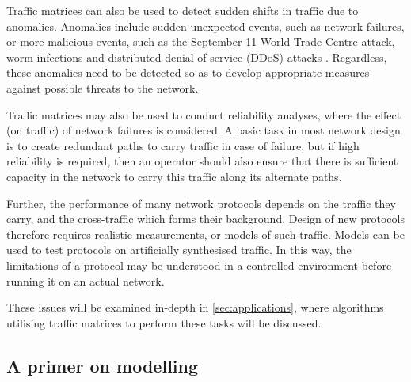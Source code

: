 Traffic matrices can also be used to detect sudden shifts in traffic
due to anomalies. Anomalies include sudden unexpected events, such as
network failures, or more malicious events, such as the September 11
World Trade Centre attack, worm infections and distributed denial of
service (DDoS) attacks \cite{Roughan02BRvariable}. Regardless, these
anomalies need to be detected so as to develop appropriate measures
against possible threats to the network. 

Traffic matrices may also be used to conduct reliability analyses,
where the effect (on traffic) of network failures is considered. A
basic task in most network design is to create redundant paths to
carry traffic in case of failure, but if high reliability is required,
then an operator should also ensure that there is sufficient capacity
in the network to carry this traffic along its alternate paths.

Further, the performance of many network protocols depends on the
traffic they carry, and the cross-traffic which forms their
background. Design of new protocols therefore requires realistic
measurements, or models of such traffic.  Models can be used to test
protocols on artificially synthesised traffic. In this way, the
limitations of a protocol may be understood in a controlled
environment before running it on an actual network.

These issues will be examined in-depth in \autoref{sec:applications},
where algorithms utilising traffic matrices to perform these tasks
will be discussed.



\subsection{A primer on modelling}


